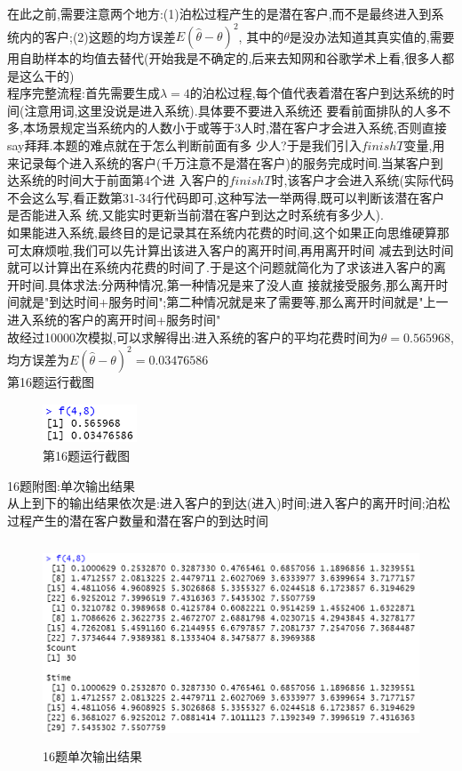 \documentclass{book}
\begin{document}
在此之前,需要注意两个地方:(1)泊松过程产生的是潜在客户,而不是最终进入到系统内的客户;(2)这题的均方误差$E(\hat{\theta}-\theta)^{2}$,
其中的$\theta$是没办法知道其真实值的,需要用自助样本的均值去替代(开始我是不确定的,后来去知网和谷歌学术上看,很多人都是这么干的) \\
程序完整流程:首先需要生成$\lambda=4$的泊松过程,每个值代表着潜在客户到达系统的时间(注意用词,这里没说是进入系统).具体要不要进入系统还
要看前面排队的人多不多,本场景规定当系统内的人数小于或等于3人时,潜在客户才会进入系统,否则直接say拜拜.本题的难点就在于怎么判断前面有多
少人?于是我们引入$finishT$变量,用来记录每个进入系统的客户(千万注意不是潜在客户)的服务完成时间.当某客户到达系统的时间大于前面第4个进
入客户的$finishT$时,该客户才会进入系统(实际代码不会这么写,看正数第31-34行代码即可,这种写法一举两得,既可以判断该潜在客户是否能进入系
统,又能实时更新当前潜在客户到达之时系统有多少人). \\
如果能进入系统,最终目的是记录其在系统内花费的时间,这个如果正向思维硬算那可太麻烦啦,我们可以先计算出该进入客户的离开时间,再用离开时间
减去到达时间就可以计算出在系统内花费的时间了.于是这个问题就简化为了求该进入客户的离开时间.具体求法:分两种情况,第一种情况是来了没人直
接就接受服务,那么离开时间就是"到达时间+服务时间";第二种情况就是来了需要等,那么离开时间就是"上一进入系统的客户的离开时间+服务时间" \\
故经过10000次模拟,可以求解得出:进入系统的客户的平均花费时间为$\theta = 0.565968$,均方误差为$E(\hat{\theta}- \theta)^{2} = 0.03476586$\\
第16题运行截图
\begin{figure}[H]  
    \centering
    \includegraphics*[height = 1.2cm, width = 2.8cm]{gramFile/第16题运行截图.PNG}
    \caption{第16题运行截图}
\end{figure}

\noindent
16题附图:单次输出结果 \\
从上到下的输出结果依次是:进入客户的到达(进入)时间;进入客户的离开时间;泊松过程产生的潜在客户数量和潜在客户的到达时间
\begin{figure}[H]
    \centering
    \includegraphics*[height = 6cm, width = 11.5cm]{gramFile/附图---16题单次输出结果.PNG}
    \caption{16题单次输出结果}
\end{figure}




\hspace*{\fill} \\
\noindent
\end{document}
